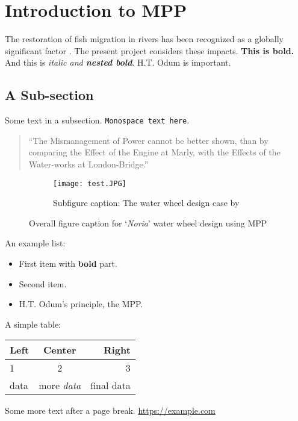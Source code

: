 \documentclass[a4paper,12pt]{article}
\newcommand{\mpp}{MPP}
\newcommand{\hto}{H.T. Odum}
\begin{document}
\section[Intro]{Introduction to \mpp}

The restoration of fish migration in rivers has been recognized as a globally significant factor \citep{cox_fish_2023, cox_fish_2023a}. The present project considers these impacts. \textbf{This is bold.} And this is \textit{italic and \textbf{nested bold}}. \hto{} is important.

\subsection{A Sub-section}
Some text in a subsection. \texttt{Monospace text here}.

\begin{quotation}
    ``The Mismanagement of Power cannot be better shown, than by comparing the Effect of the Engine at Marly, with the Effects of the Water-works at London-Bridge.'' 
    \citep[p.~530]{desaguliers_course_1734}
\end{quotation}

\begin{figure}[H]
    \centering
    \begin{subfigure}{.48\textwidth} 
        \centering
        \texttt{[image: test.JPG]}
        \caption{Subfigure caption: The water wheel design case by \citet[p.~101]{vitruvius_architectura_1511}}
        \label{fig:vitruvius}
    \end{subfigure}
    \caption{Overall figure caption for `\textit{Noria}' water wheel design using \mpp}
    \label{fig:waterwheel:contrast}
\end{figure}

An example list:
\begin{itemize}
    \item First item with \textbf{bold} part.
    \item Second item.
    \item \hto's principle, the \mpp.
\end{itemize}

A simple table:
\begin{tabular}{|l|c|r|}
\hline
Left & \textbf{Center} & Right \\
\hline
1 & 2 & 3 \\
data & more \textit{data} & final data \\
\hline
\end{tabular}

\newpage

Some more text after a page break. \url{https://example.com}


\end{document}
